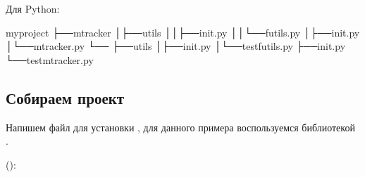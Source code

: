 \documentclass[letterpaper,10pt,russian]{sphinxmanual}
\begin{document}
\sphinxAtStartPar
Для Python:

\begin{sphinxVerbatim}[commandchars=\\\{\}]
my\PYGZus{}project
├──mtracker
│├──utils
││├──\PYGZus{}\PYGZus{}init\PYGZus{}\PYGZus{}.py
││└──futils.py
│├──\PYGZus{}\PYGZus{}init\PYGZus{}\PYGZus{}.py
│└──mtracker.py
└──
├──utils
│├──\PYGZus{}\PYGZus{}init\PYGZus{}\PYGZus{}.py
│└──test\PYGZus{}futils.py
├──\PYGZus{}\PYGZus{}init\PYGZus{}\PYGZus{}.py
└──test\PYGZus{}mtracker.py
\end{sphinxVerbatim}

\sphinxAtStartPar
{}


\subsection{Собираем проект}
\label{\detokenize{educational_materials/code_to_lib/content:id4}}
\sphinxAtStartPar
Напишем файл для установки , для данного примера воспользуемся библиотекой .

\sphinxAtStartPar
():
\end{document}
